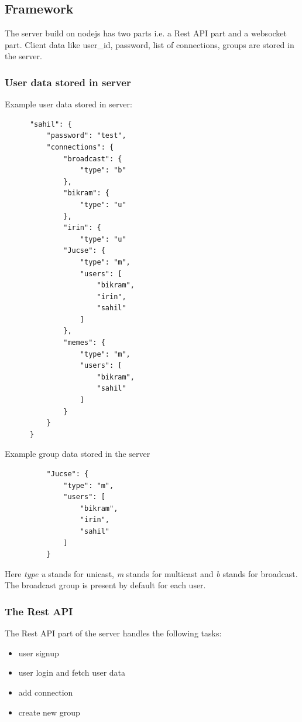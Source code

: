 \documentclass[titlepage]{article}
\begin{document}
    \subsection{Framework}
    The server build on nodejs has two parts i.e. a Rest API part and a websocket part.
    Client data like user\_id, password, list of connections, groups are stored in the server.

    \subsubsection{User data stored in server}
    Example user data stored in server:
    \begin{verbatim}
      "sahil": {
          "password": "test",
          "connections": {
              "broadcast": {
                  "type": "b"
              },
              "bikram": {
                  "type": "u"
              },
              "irin": {
                  "type": "u"
              "Jucse": {
                  "type": "m",
                  "users": [
                      "bikram",
                      "irin",
                      "sahil"
                  ]
              },
              "memes": {
                  "type": "m",
                  "users": [
                      "bikram",
                      "sahil"
                  ]
              }
          }
      }
    \end{verbatim}
    
    Example group data stored in the server
    \begin{verbatim}
          "Jucse": {
              "type": "m",
              "users": [
                  "bikram",
                  "irin",
                  "sahil"
              ]
          }
    \end{verbatim}

    Here \emph{type} \emph{u} stands for unicast, \emph{m} stands for multicast
    and \emph{b} stands for broadcast.
    The broadcast group is present by default for each user.

    \subsubsection{The Rest API} 
    The Rest API part of the server handles the following tasks:
    \begin{itemize}
        \item user signup
        \item user login and fetch user data
        \item add connection
        \item create new group
    \end{itemize}
\end{document}
